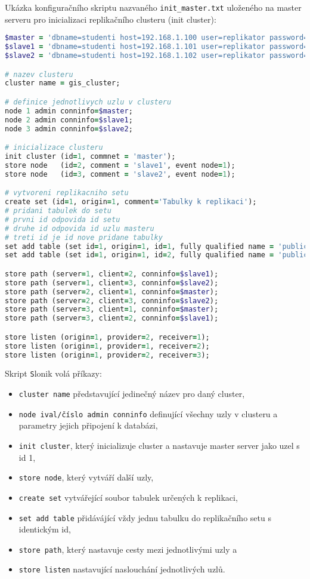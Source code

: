 Ukázka konfiguračního skriptu nazvaného \texttt{init\_master.txt} uloženého na master serveru pro inicializaci replikačního clusteru (init cluster):
\begin{lstlisting}[language=ruby]
$master = 'dbname=studenti host=192.168.1.100 user=replikator password=kgigis'
$slave1 = 'dbname=studenti host=192.168.1.101 user=replikator password=kgigis'
$slave2 = 'dbname=studenti host=192.168.1.102 user=replikator password=kgigis'

# nazev clusteru
cluster name = gis_cluster;

# definice jednotlivych uzlu v clusteru
node 1 admin conninfo=$master;
node 2 admin conninfo=$slave1;
node 3 admin conninfo=$slave2;

# inicializace clusteru
init cluster (id=1, commnet = 'master');
store node   (id=2, comment = 'slave1', event node=1);
store node   (id=3, comment = 'slave2', event node=1);

# vytvoreni replikacniho setu
create set (id=1, origin=1, comment='Tabulky k replikaci');
# pridani tabulek do setu
# prvni id odpovida id setu
# druhe id odpovida id uzlu masteru
# treti id je id nove pridane tabulky
set add table (set id=1, origin=1, id=1, fully qualified name = 'public.student', comment='seznam studentu');
set add table (set id=1, origin=1, id=2, fully qualified name = 'public.rodne_mesto', comment='seznam mest');

store path (server=1, client=2, conninfo=$slave1);
store path (server=1, client=3, conninfo=$slave2);
store path (server=2, client=1, conninfo=$master);
store path (server=2, client=3, conninfo=$slave2);
store path (server=3, client=1, conninfo=$master);
store path (server=3, client=2, conninfo=$slave1);

store listen (origin=1, provider=2, receiver=1);
store listen (origin=1, provider=1, receiver=2);
store listen (origin=1, provider=2, receiver=3);
\end{lstlisting}

Skript {\texttt Slonik} volá příkazy:
\begin{itemize}
\item \texttt{cluster name} představující jedinečný název pro daný cluster,
\item \texttt{node ival/číslo admin conninfo} definující všechny uzly v clusteru a parametry jejich připojení k databázi,
\item \texttt{init cluster}, který inicializuje cluster a nastavuje master server jako uzel s id 1, 
\item \texttt{store node}, který vytváří další uzly,
\item \texttt{create set} vytvářející soubor tabulek určených k replikaci, 
\item \texttt{set add table} přidávájící vždy jednu tabulku do replikačního setu s identickým id,
\item \texttt{store path}, který nastavuje cesty mezi jednotlivými uzly a 
\item \texttt{store listen} nastavující naslouchání jednotlivých uzlů. 
\end{itemize}

